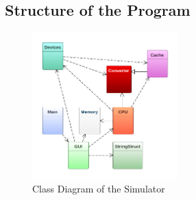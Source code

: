 \documentclass[10pt]{article}
\begin{document}
\subsection{Structure of the Program}
\begin{figure}[H]
\centering
\includegraphics[width=0.5\textwidth]{Pics/class_diagram.png}
\caption{Class Diagram of the Simulator}
\label{fig:class_diagram}
\end{figure}
\end{document}
